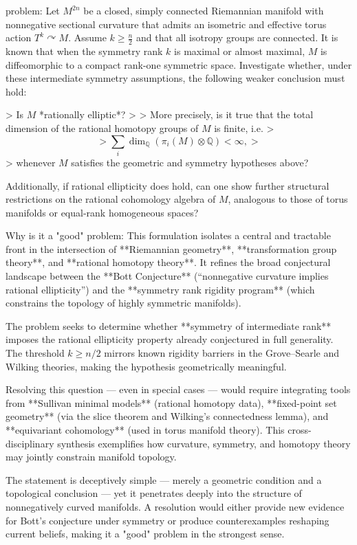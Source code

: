 problem:  
Let \(M^{2n}\) be a closed, simply connected Riemannian manifold with nonnegative sectional curvature that admits an isometric and effective torus action \(T^k \curvearrowright M\). Assume \(k \ge \frac{n}{2}\) and that all isotropy groups are connected.  
It is known that when the symmetry rank \(k\) is maximal or almost maximal, \(M\) is diffeomorphic to a compact rank-one symmetric space.  
Investigate whether, under these intermediate symmetry assumptions, the following weaker conclusion must hold:  

> Is \(M\) *rationally elliptic*?  
>  
> More precisely, is it true that the total dimension of the rational homotopy groups of \(M\) is finite, i.e.  
> \[
> \sum_i \dim_\mathbb{Q}(\pi_i(M)\otimes \mathbb{Q}) < \infty,
> \]
> whenever \(M\) satisfies the geometric and symmetry hypotheses above?

Additionally, if rational ellipticity does hold, can one show further structural restrictions on the rational cohomology algebra of \(M\), analogous to those of torus manifolds or equal-rank homogeneous spaces?  

Why is it a "good" problem:  
This formulation isolates a central and tractable front in the intersection of **Riemannian geometry**, **transformation group theory**, and **rational homotopy theory**. It refines the broad conjectural landscape between the **Bott Conjecture** (“nonnegative curvature implies rational ellipticity”) and the **symmetry rank rigidity program** (which constrains the topology of highly symmetric manifolds).  

The problem seeks to determine whether **symmetry of intermediate rank** imposes the rational ellipticity property already conjectured in full generality. The threshold \(k \ge n/2\) mirrors known rigidity barriers in the Grove–Searle and Wilking theories, making the hypothesis geometrically meaningful.  

Resolving this question — even in special cases — would require integrating tools from **Sullivan minimal models** (rational homotopy data), **fixed-point set geometry** (via the slice theorem and Wilking’s connectedness lemma), and **equivariant cohomology** (used in torus manifold theory). This cross-disciplinary synthesis exemplifies how curvature, symmetry, and homotopy theory may jointly constrain manifold topology.  

The statement is deceptively simple — merely a geometric condition and a topological conclusion — yet it penetrates deeply into the structure of nonnegatively curved manifolds. A resolution would either provide new evidence for Bott’s conjecture under symmetry or produce counterexamples reshaping current beliefs, making it a "good" problem in the strongest sense.
